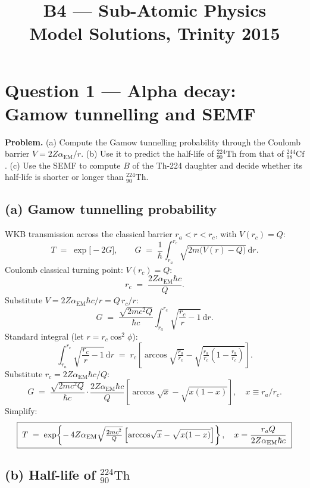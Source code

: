 \documentclass[11pt]{article}
\title{B4 --- Sub-Atomic Physics \\ Model Solutions, Trinity 2015}
\author{}
\date{}
\newcommand{\de}{\mathrm{d}}
\begin{document}
\maketitle

\section*{Question 1 --- Alpha decay: Gamow tunnelling and SEMF}

\textbf{Problem.} (a) Compute the Gamow tunnelling probability through the Coulomb barrier $V=2Z\alpha_\text{EM}/r$. (b) Use it to predict the half-life of $^{224}_{90}\text{Th}$ from that of $^{244}_{98}\text{Cf}$. (c) Use the SEMF to compute $B$ of the Th-224 daughter and decide whether its half-life is shorter or longer than $^{224}_{90}\text{Th}$.

\subsection*{(a) Gamow tunnelling probability}

WKB transmission across the classical barrier $r_a<r<r_c$, with $V(r_c)=Q$:
\begin{equation}
T \;=\; \exp\!\bigl[-2G\bigr], \qquad G \;=\; \frac{1}{\hbar}\!\int_{r_a}^{r_c}\!\sqrt{2m\bigl(V(r)-Q\bigr)}\,\de r .
\label{eq:WKB}
\end{equation}
Coulomb classical turning point: $V(r_c)=Q$:
\[
r_c \;=\; \frac{2Z\alpha_\text{EM}\hbar c}{Q}.
\]
Substitute $V=2Z\alpha_\text{EM}\hbar c/r = Q\,r_c/r$:
\[
G \;=\; \frac{\sqrt{2m c^2 Q}}{\hbar c}\!\int_{r_a}^{r_c}\!\sqrt{\frac{r_c}{r}-1}\,\de r.
\]
Standard integral (let $r=r_c\cos^2\phi$):
\[
\int_{r_a}^{r_c}\!\sqrt{\frac{r_c}{r}-1}\,\de r \;=\; r_c\!\left[\arccos\!\sqrt{\tfrac{r_a}{r_c}} - \sqrt{\tfrac{r_a}{r_c}\!\left(1-\tfrac{r_a}{r_c}\right)}\right].
\]
Substitute $r_c=2Z\alpha_\text{EM}\hbar c/Q$:
\[
G \;=\; \frac{\sqrt{2mc^2Q}}{\hbar c}\cdot\frac{2Z\alpha_\text{EM}\hbar c}{Q}\!\left[\arccos\!\sqrt{x}-\sqrt{x(1-x)}\right], \quad x\equiv r_a/r_c.
\]
Simplify:
\begin{equation}
\boxed{\;T \;=\; \exp\!\left\{-\,4Z\alpha_\text{EM}\sqrt{\tfrac{2mc^2}{Q}}\,\Bigl[\arccos\!\sqrt{x}-\sqrt{x(1-x)}\Bigr]\right\},\quad x=\frac{r_a Q}{2Z\alpha_\text{EM}\hbar c}\;}
\label{eq:Gamow}
\end{equation}

\subsection*{(b) Half-life of $^{224}_{90}\text{Th}$}
\end{document}
